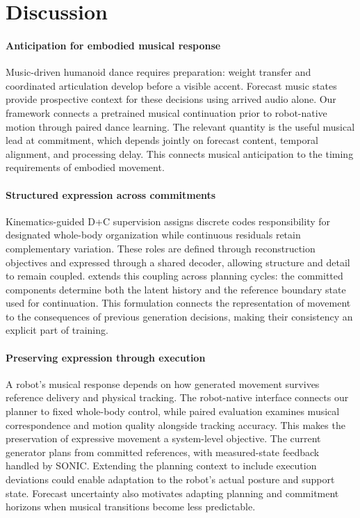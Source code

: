 \section{Discussion}
\label{sec:evidence_scope}

\paragraph{Anticipation for embodied musical response}
Music-driven humanoid dance requires preparation:
weight transfer and coordinated articulation develop
before a visible accent.
Forecast music states provide prospective context for
these decisions using arrived audio alone.
Our framework connects a pretrained musical continuation
prior to robot-native motion through paired dance learning.
The relevant quantity is the useful musical lead at
commitment, which depends jointly on forecast content,
temporal alignment, and processing delay.
This connects musical anticipation to the timing
requirements of embodied movement.

\paragraph{Structured expression across commitments}
Kinematics-guided D+C supervision assigns discrete codes
responsibility for designated whole-body organization
while continuous residuals retain complementary variation.
These roles are defined through reconstruction objectives
and expressed through a shared decoder, allowing structure
and detail to remain coupled.
\cof{} extends this coupling across planning cycles:
the committed components determine both the latent
history and the reference boundary state used for
continuation.
This formulation connects the representation of movement
to the consequences of previous generation decisions,
making their consistency an explicit part of training.

\paragraph{Preserving expression through execution}
A robot's musical response depends on how generated
movement survives reference delivery and physical tracking.
The robot-native interface connects our planner to
fixed whole-body control, while paired evaluation
examines musical correspondence and motion quality
alongside tracking accuracy.
This makes the preservation of expressive movement
a system-level objective.
The current generator plans from committed references,
with measured-state feedback handled by SONIC.
Extending the planning context to include execution
deviations could enable adaptation to the robot's
actual posture and support state.
Forecast uncertainty also motivates adapting planning
and commitment horizons when musical transitions
become less predictable.

